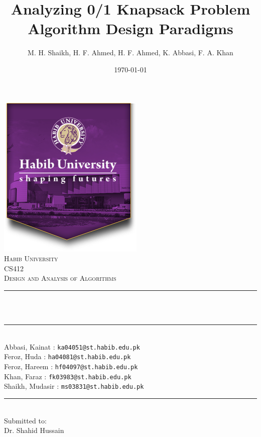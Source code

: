 \documentclass[a4paper, 11pt]{article}
\title{Analyzing 0/1 Knapsack Problem Algorithm Design Paradigms}								%
\author{M. H. Shaikh, H. F. Ahmed, H. F. Ahmed, K. Abbasi, F. A. Khan}								%
\date{\today}											%
\makeatletter
\let\thetitle\@title
\let\thedate\@date
\makeatother
\begin{document}

\begin{titlepage}
	\centering
    \vspace*{0.5 cm}
    \includegraphics[scale = 0.47]{logo.png}\\[1.0 cm]	%
    \textsc{\LARGE Habib University}\\[1.0 cm]	%
	\textsc{\Large CS412}\\[0.5 cm]				%
	\textsc{\large Design and Analysis of Algorithms}\\[0.5 cm]				%
	\rule{\linewidth}{0.2 mm} \\[0.4 cm]
	{ \huge \bfseries \thetitle}\\
	\rule{\linewidth}{0.2 mm} \\[0.5 cm]
	{Abbasi, Kainat :
            \texttt{ka04051@st.habib.edu.pk}} \\
    {Feroz, Huda :
    \texttt{ha04081@st.habib.edu.pk}} \\
    {Feroz, Hareem :
    \texttt{hf04097@st.habib.edu.pk}} \\
    {Khan, Faraz :
            \texttt{fk03983@st.habib.edu.pk}} \\
	{Shaikh, Mudasir :
            \texttt{ms03831@st.habib.edu.pk}} \\
	\rule{\linewidth}{0.2 mm} \\[0.5 cm]
	{Submitted to:}\\
			Dr. Shahid  Hussain \\ 
	{\large \thedate}\\[2 cm]
	\vfill
	
\end{titlepage}
\end{document}
